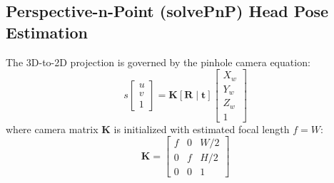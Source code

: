 \documentclass[11pt,a4paper]{article}
\begin{document}
\subsection{Perspective-n-Point (solvePnP) Head Pose Estimation}
The 3D-to-2D projection is governed by the pinhole camera equation:
\begin{equation}
s \begin{bmatrix} u \\ v \\ 1 \end{bmatrix} = \mathbf{K} [\mathbf{R} \mid \mathbf{t}] \begin{bmatrix} X_w \\ Y_w \\ Z_w \\ 1 \end{bmatrix}
\end{equation}
where camera matrix $\mathbf{K}$ is initialized with estimated focal length $f = W$:
\begin{equation}
\mathbf{K} = \begin{bmatrix} f & 0 & W/2 \\ 0 & f & H/2 \\ 0 & 0 & 1 \end{bmatrix}
\end{equation}

\newpage
\end{document}
